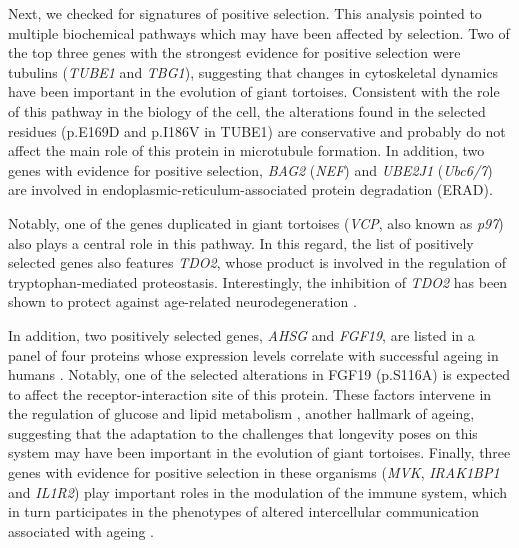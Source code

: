 Next, we checked for signatures of positive selection.
This analysis pointed to multiple biochemical pathways which may have been affected by selection.
Two of the top three genes with the strongest evidence for positive selection were tubulins (\textit{TUBE1} and \textit{TBG1}), suggesting that changes in cytoskeletal dynamics have been important in the evolution of giant tortoises.
Consistent with the role of this pathway in the biology of the cell, the alterations found in the selected residues (p.E169D and p.I186V in TUBE1) are conservative and probably do not affect the main role of this protein in microtubule formation.
In addition, two genes with evidence for positive selection, \textit{BAG2} (\textit{NEF}) and \textit{UBE2J1} (\textit{Ubc6/7}) are involved in endoplasmic-reticulum-associated protein degradation (ERAD).

Notably, one of the genes duplicated in giant tortoises (\textit{VCP}, also known as \textit{p97}) also plays a central role in this pathway.
In this regard, the list of positively selected genes also features \textit{TDO2}, whose product is involved in the regulation of tryptophan-mediated proteostasis.
Interestingly, the inhibition of \textit{TDO2} has been shown to protect against age-related neurodegeneration \cite{Breda2016}.

In addition, two positively selected genes, \textit{AHSG} and \textit{FGF19}, are listed in a panel of four proteins whose expression levels correlate with successful ageing in humans \cite{Sanchis-Gomar2015}.
Notably, one of the selected alterations in FGF19 (p.S116A) is expected to affect the receptor-interaction site of this protein.
These factors intervene in the regulation of glucose and lipid metabolism \cite{Kir2011,Pal2012}, another hallmark of ageing, suggesting that the adaptation to the challenges that longevity poses on this system may have been important in the evolution of giant tortoises.
Finally, three genes with evidence for positive selection in these organisms (\textit{MVK}, \textit{IRAK1BP1} and \textit{IL1R2}) play important roles in the modulation of the immune system, which in turn participates in the phenotypes of altered intercellular communication associated with ageing \cite{Lopez-Otin2013}.

